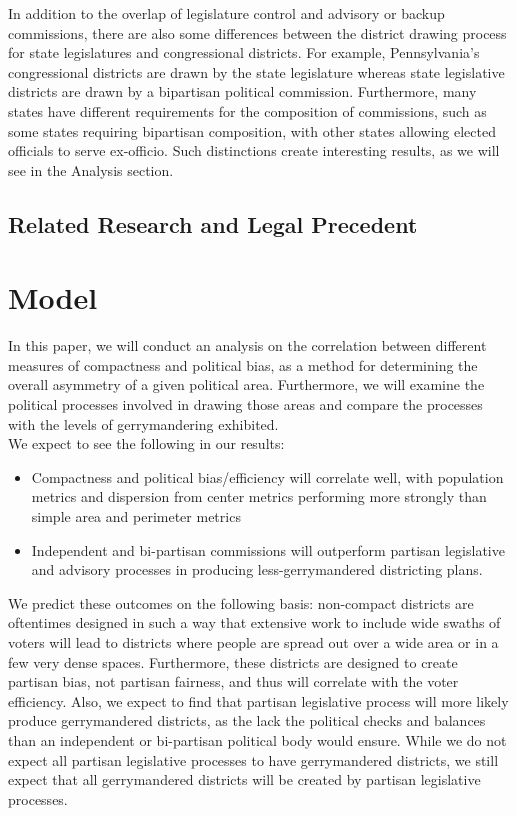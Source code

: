 \documentclass[12pt]{article}
\begin{document}
In addition to the overlap of legislature control and advisory or backup commissions, there are also some differences between the district drawing process for state legislatures and congressional districts.  For example, Pennsylvania's congressional districts are drawn by the state legislature whereas state legislative districts are drawn by a bipartisan political commission.  Furthermore, many states have different requirements for the composition of commissions, such as some states requiring bipartisan composition, with other states allowing elected officials to serve ex-officio.  Such distinctions create interesting results, as we will see in the Analysis section.

\subsection{Related Research and Legal Precedent}

  \section{Model}
  In this paper, we will conduct an analysis on the correlation between different measures of compactness and political bias, as a method for determining the overall asymmetry of a given political area.  Furthermore, we will examine the political processes involved in drawing those areas and compare the processes with the levels of gerrymandering exhibited.\\
  
  We expect to see the following in our results:
  \begin{itemize}
  \item Compactness and political bias/efficiency will correlate well, with population metrics and dispersion from center metrics performing more strongly than simple area and perimeter metrics 
  \item Independent and bi-partisan commissions will outperform partisan legislative and advisory processes in producing less-gerrymandered districting plans.
  \end{itemize}
  
  We predict these outcomes on the following basis: non-compact districts are oftentimes designed in such a way that extensive work to include wide swaths of voters will lead to districts where people are spread out over a wide area or in a few very dense spaces.  Furthermore, these districts are designed to create partisan bias, not partisan fairness, and thus will correlate with the voter efficiency.  Also, we expect to find that partisan legislative process will more likely produce gerrymandered districts, as the lack the political checks and balances than an independent or bi-partisan political body would ensure.  While we do not expect all partisan legislative processes to have gerrymandered districts, we still expect that all gerrymandered districts will be created by partisan legislative processes.
\end{document}
